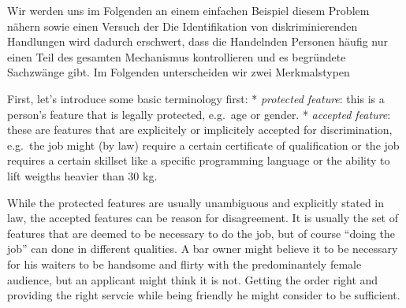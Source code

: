 \documentclass[
]{book}
\theoremstyle{definition}
\theoremstyle{definition}
\theoremstyle{definition}
\theoremstyle{remark}
\begin{document}
Wir werden uns im Folgenden an einem einfachen Beispiel diesem Problem nähern sowie einen Versuch der
Die Identifikation von diskriminierenden Handlungen wird dadurch erschwert, dass die Handelnden Personen häufig nur einen Teil des gesamten Mechanismus kontrollieren und es begründete Sachzwänge gibt.
Im Folgenden unterscheiden wir zwei Merkmalstypen

First, let's introduce some basic terminology first:
* \emph{protected feature}: this is a person's feature that is legally protected, e.g.~age or gender.
* \emph{accepted feature}: these are features that are explicitely or implicitely accepted for discrimination, e.g.~the job might (by law) require a certain certificate of qualification or the job requires a certain skillset like a specific programming language or the ability to lift weigths heavier than 30 kg.

While the protected features are usually unambiguous and explicitly stated in law, the accepted features can be reason for disagreement. It is usually the set of features that are deemed to be necessary to do the job, but of course ``doing the job'' can done in different qualities. A bar owner might believe it to be necessary for his waiters to be handsome and flirty with the predominantely female audience, but an applicant might think it is not. Getting the order right and providing the right servcie while being friendly he might consider to be sufficient.
\end{document}
